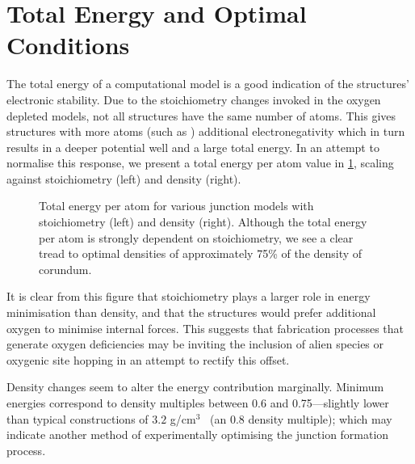 \section{Total Energy and Optimal Conditions}
The total energy of a computational model is a good indication of the structures' electronic stability.
Due to the stoichiometry changes invoked in the oxygen depleted models, not all structures have the same number of atoms.
This gives structures with more atoms (such as ) additional electronegativity which in turn results in a deeper potential well and a large total energy.
In an attempt to normalise this response, we present a total energy per atom value in \cref{fig:energyperatom}, scaling against stoichiometry (left) and density (right).

\begin{figure}[tbp]
\peratommargins
\begin{adjustwidth}{\peratomleft}{\peratomright}
\resizebox{\widefigure}{!}{}
\caption[Energy Comparisons]{\label{fig:energyperatom}Total energy per atom for various junction models with stoichiometry (left) and density (right).  Although the total energy per atom is strongly dependent on stoichiometry, we see a clear tread to optimal densities of approximately 75\% of the density of corundum.}
\end{adjustwidth}
\end{figure}

It is clear from this figure that stoichiometry plays a larger role in energy minimisation than density, and that the structures would prefer additional oxygen to minimise internal forces.
This suggests that fabrication processes that generate oxygen deficiencies may be inviting the inclusion of alien species or oxygenic site hopping in an attempt to rectify this offset.

Density changes seem to alter the energy contribution marginally.
Minimum energies correspond to density multiples between 0.6 and 0.75---slightly lower than typical constructions of $3.2$ g/cm$^\text{3}$~\cite{Barbour1998} (an 0.8 density multiple); which may indicate another method of experimentally optimising the junction formation process.

